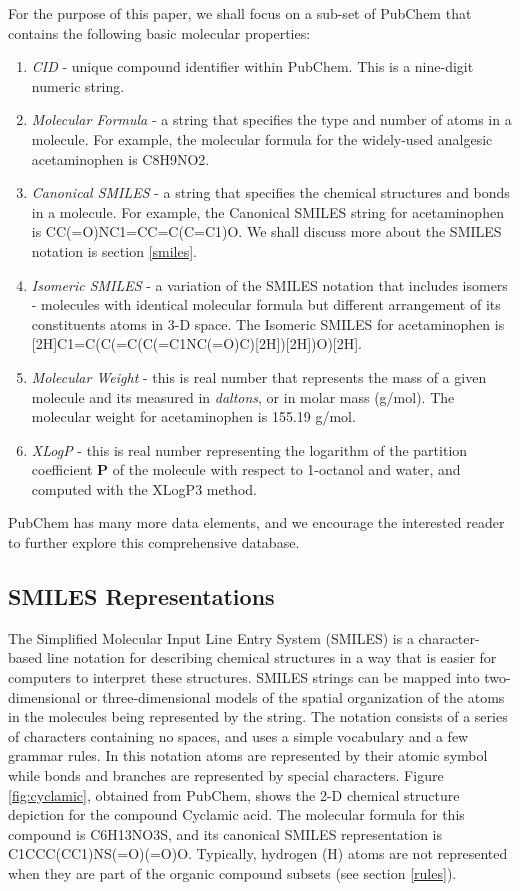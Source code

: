 For the purpose of this paper, we shall focus on a sub-set of PubChem that contains the following basic molecular properties:
\begin{enumerate}
	\item {\em CID} - unique compound identifier within PubChem. This is a nine-digit numeric string. 
	\item {\em Molecular Formula} -  a string that specifies the type and number of atoms in a molecule. For example, the molecular formula for the widely-used analgesic acetaminophen is C8H9NO2.
	\item {\em Canonical SMILES} - a string that specifies the chemical structures and bonds in a molecule. For example, the Canonical SMILES string for acetaminophen is CC(=O)NC1=CC=C(C=C1)O. We shall discuss more about the SMILES notation is section \ref{smiles}.
	\item {\em Isomeric SMILES} - a variation of the SMILES notation that includes isomers - molecules with identical molecular formula but different arrangement of its constituents atoms in 3-D space. The Isomeric SMILES for acetaminophen is [2H]C1=C(C(=C(C(=C1NC(=O)C)[2H])[2H])O)[2H].
	\item {\em Molecular Weight} - this is real number that represents the mass of a given molecule and its measured in {\em daltons}, or in molar mass (g/mol). The molecular weight for acetaminophen is 155.19 g/mol.
	\item {\em XLogP} - this is real number representing the logarithm of the partition coefficient $\boldsymbol P$ of the molecule with respect to 1-octanol and water, and computed with the XLogP3 method. 
\end{enumerate}
PubChem has many more data elements, and we encourage the interested reader to further explore this comprehensive database. 

\subsection{SMILES Representations\label{smiles}}
The Simplified Molecular Input Line Entry System (SMILES) is a character-based line notation for describing chemical structures in a way that is easier for computers to interpret
these structures. SMILES strings can be mapped into two-dimensional or three-dimensional models of the spatial organization of the atoms in the molecules being represented by the string. The notation consists of a series of characters containing no spaces, and uses a simple vocabulary and a few grammar rules. In this notation atoms are represented by their atomic symbol while bonds and branches are represented by special characters. Figure \ref{fig:cyclamic}, obtained from PubChem,  shows the 2-D chemical structure depiction for the compound Cyclamic acid. The molecular formula for this compound is C6H13NO3S, and its canonical SMILES representation is C1CCC(CC1)NS(=O)(=O)O. Typically, hydrogen (H) atoms are not represented when they are part of the organic compound subsets (see section \ref{rules}).

